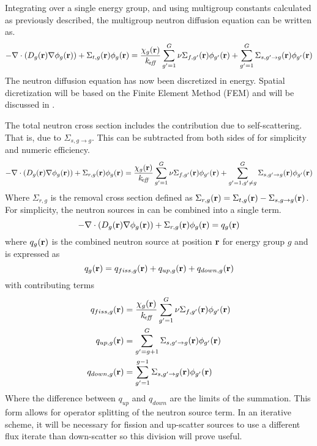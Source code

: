   Integrating  over a single energy group, and
  using multigroup constants calculated as previously described, the multigroup
  neutron diffusion equation can be written as.
  \begin{equation}
    \label{eq:multigroup_diffusion}
    - \mathbf{\nabla} \cdot ( D_g(\mathbf{r}) \mathbf{\nabla} \phi_g(\mathbf{r})) + \Sigma_{t,g}(\mathbf{r}) \phi_g(\mathbf{r})= 
      \frac{\chi_g(\mathbf{r})}{k_{\!\mbox{\scriptsize \em eff}}} \sum_{g'=1}^{G} \nu\Sigma_{f,g'}(\mathbf{r}) 
      \phi_{g'}(\mathbf{r}) + \sum_{g'=1}^{G} \Sigma_{s,g' \rightarrow g}(\mathbf{r}) 
      \phi_{g'}(\mathbf{r})
  \end{equation}
  The neutron diffusion equation has now been discretized in energy.
  Spatial dicretization will be based on the Finite Element Method (FEM) and 
  will be discussed in .
  
  The total neutron cross section includes the contribution due to 
  self-scattering. That is, due to $\Sigma_{s,g\rightarrow g}$. This can be 
  subtracted from both sides of  for simplicity 
  and numeric efficiency.
  \begin{equation} \label{eq:multigroup_removal}
    - \mathbf{\nabla} \cdot( D_g(\mathbf{r}) \mathbf{\nabla} \phi_g(\mathbf{r})) + \Sigma_{r,g}(\mathbf{r}) \phi_g(\mathbf{r}) = 
      \frac{\chi_g(\mathbf{r})}{k_{\!\mbox{\scriptsize \em eff}}} \sum_{g'=1}^{G} \nu\Sigma_{f,g'}(\mathbf{r}) 
      \phi_{g'}(\mathbf{r}) + \sum_{g'=1, g' \ne g}^{G} 
      \Sigma_{s,g' \rightarrow g}(\mathbf{r}) \phi_{g'}(\mathbf{r})
  \end{equation}
  Where $\Sigma_{r,g}$ is the removal cross section defined as 
  $\Sigma_{r,g}(\mathbf{r}) = \Sigma_{t,g}(\mathbf{r}) - \Sigma_{s,g\rightarrow g}(\mathbf{r})$. For
  simplicity, the neutron sources in  can be 
  combined into a single term.
  \begin{equation} \label{eq:multigroup_source}
    - \mathbf{\nabla} \cdot( D_g(\mathbf{r}) \mathbf{\nabla} \phi_g(\mathbf{r})) + \Sigma_{r,g}(\mathbf{r}) \phi_g(\mathbf{r}) = 
      q_g(\mathbf{r})
  \end{equation}
  where $q_g(\mathbf{r})$ is the combined neutron source at position $\mathbf{r}$ for energy
  group $g$ and is
  expressed as
  \begin{equation}
    \label{eq:q}
    q_g(\mathbf{r}) = q_{fiss,g}(\mathbf{r}) + q_{up,g}(\mathbf{r}) + q_{down,g}(\mathbf{r}) \\
  \end{equation}
  with contributing terms
  \begin{align}
    \label{eq:qfiss}
    q_{fiss,g}(\mathbf{r}) &= \frac{\chi_g(\mathbf{r})}{k_{\!\mbox{\scriptsize \em eff}}} \sum_{g'=1}^{G} 
      \nu \Sigma_{f,g'}(\mathbf{r}) \phi_{g'}(\mathbf{r}) \\
    \label{eq:qup}
    q_{up,g}(\mathbf{r}) &= \sum_{g'=g+1}^{G} \Sigma_{s,g' \rightarrow g}(\mathbf{r})
      \phi_{g'}(\mathbf{r}) \\
    \label{eq:qdown}
    q_{down,g}(\mathbf{r}) &= \sum_{g'=1}^{g-1} \Sigma_{s,g' \rightarrow g}(\mathbf{r})
      \phi_{g'}(\mathbf{r})
  \end{align}
  Where the difference between $q_{up}$ and $q_{down}$ are the limits of the 
  summation. This form allows for operator splitting of the neutron source term.
  In an iterative scheme, it will be necessary for fission and up-scatter 
  sources to use a different flux iterate than down-scatter so this division
  will prove useful.

